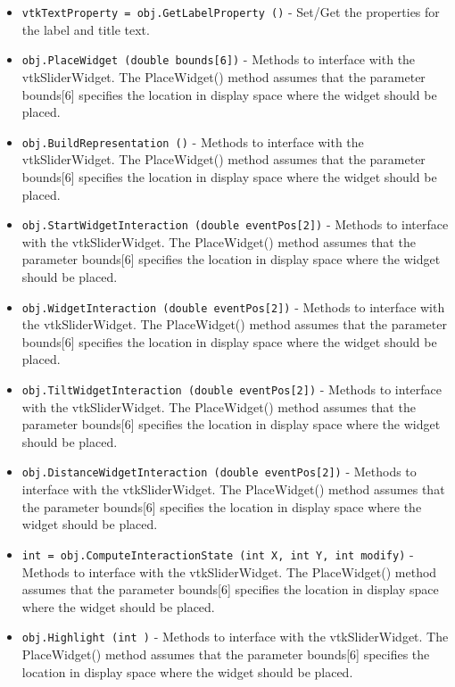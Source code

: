 \begin{itemize}
\item  \verb|vtkTextProperty = obj.GetLabelProperty ()| -  Set/Get the properties for the label and title text.

\item  \verb|obj.PlaceWidget (double bounds[6])| -  Methods to interface with the vtkSliderWidget. The PlaceWidget() method
 assumes that the parameter bounds[6] specifies the location in display
 space where the widget should be placed.

\item  \verb|obj.BuildRepresentation ()| -  Methods to interface with the vtkSliderWidget. The PlaceWidget() method
 assumes that the parameter bounds[6] specifies the location in display
 space where the widget should be placed.

\item  \verb|obj.StartWidgetInteraction (double eventPos[2])| -  Methods to interface with the vtkSliderWidget. The PlaceWidget() method
 assumes that the parameter bounds[6] specifies the location in display
 space where the widget should be placed.

\item  \verb|obj.WidgetInteraction (double eventPos[2])| -  Methods to interface with the vtkSliderWidget. The PlaceWidget() method
 assumes that the parameter bounds[6] specifies the location in display
 space where the widget should be placed.

\item  \verb|obj.TiltWidgetInteraction (double eventPos[2])| -  Methods to interface with the vtkSliderWidget. The PlaceWidget() method
 assumes that the parameter bounds[6] specifies the location in display
 space where the widget should be placed.

\item  \verb|obj.DistanceWidgetInteraction (double eventPos[2])| -  Methods to interface with the vtkSliderWidget. The PlaceWidget() method
 assumes that the parameter bounds[6] specifies the location in display
 space where the widget should be placed.

\item  \verb|int = obj.ComputeInteractionState (int X, int Y, int modify)| -  Methods to interface with the vtkSliderWidget. The PlaceWidget() method
 assumes that the parameter bounds[6] specifies the location in display
 space where the widget should be placed.

\item  \verb|obj.Highlight (int )| -  Methods to interface with the vtkSliderWidget. The PlaceWidget() method
 assumes that the parameter bounds[6] specifies the location in display
 space where the widget should be placed.


\end{itemize}
